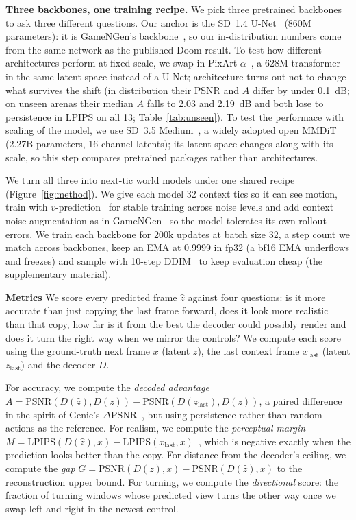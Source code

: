 \documentclass{article}
\newif\ifwithappendix \withappendixfalse %
\newcommand{\appref}[1]{\ifwithappendix Appendix~\ref{#1}\else the supplementary material\fi}
\begin{document}
\textbf{Three backbones, one training recipe.} We pick three pretrained backbones to ask three different questions. Our anchor is the SD~1.4 U-Net~\citep{rombach2022ldm} (860M parameters): it is GameNGen's backbone~\citep{valevski2024gamengen}, so our in-distribution numbers come from the same network as the published Doom result. To test how different architectures perform at fixed scale, we swap in PixArt-$\alpha$~\citep{chen2023pixart}, a 628M transformer in the same latent space instead of a U-Net; architecture turns out not to change what survives the shift (in distribution their PSNR and $A$ differ by under 0.1~dB; on unseen arenas their median $A$ falls to 2.03 and 2.19~dB and both lose to persistence in LPIPS on all 13; Table~\ref{tab:unseen}). To test the performace with scaling of the model, we use SD~3.5 Medium~\citep{esser2024sd3}, a widely adopted open MMDiT (2.27B parameters, 16-channel latents); its latent space changes along with its scale, so this step compares pretrained packages rather than architectures.

We turn all three into next-tic world models under one shared recipe (Figure~\ref{fig:method}). We give each model 32 context tics so it can see motion, train with $v$-prediction~\citep{salimans2022progressive} for stable training across noise levels and add context noise augmentation as in GameNGen~\citep{valevski2024gamengen} so the model tolerates its own rollout errors. We train each backbone for 200k updates at batch size 32, a step count we match across backbones, keep an EMA at 0.9999 in fp32 (a bf16 EMA underflows and freezes) and sample with 10-step DDIM~\citep{song2021ddim} to keep evaluation cheap (\appref{app:protocol}).

\textbf{Metrics} We score every predicted frame $\hat z$ against four questions: is it more accurate than just copying the last frame forward, does it look more realistic than that copy, how far is it from the best the decoder could possibly render and does it turn the right way when we mirror the controls? We compute each score using the ground-truth next frame $x$ (latent $z$), the last context frame $x_\text{last}$ (latent $z_\text{last}$) and the decoder $D$.

For accuracy, we compute the \emph{decoded advantage} $A=\mathrm{PSNR}(D(\hat z),D(z))-\mathrm{PSNR}(D(z_\text{last}),D(z))$, a paired difference in the spirit of Genie's $\Delta$PSNR~\citep{bruce2024genie}, but using persistence rather than random actions as the reference. For realism, we compute the \emph{perceptual margin} $M=\mathrm{LPIPS}(D(\hat z),x)-\mathrm{LPIPS}(x_\text{last},x)$~\citep{zhang2018lpips}, which is negative exactly when the prediction looks better than the copy. For distance from the decoder's ceiling, we compute the \emph{gap} $G=\mathrm{PSNR}(D(z),x)-\mathrm{PSNR}(D(\hat z),x)$ to the reconstruction upper bound. For turning, we compute the \emph{directional} score: the fraction of turning windows whose predicted view turns the other way once we swap left and right in the newest control.
\end{document}
